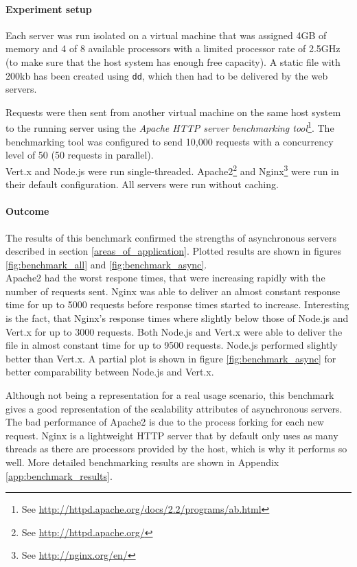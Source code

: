 \paragraph{Experiment setup} Each server was run isolated on a virtual machine
that was assigned 4GB of memory and 4 of 8 available processors with a limited processor rate
of 2.5GHz (to make sure that the host system has enough free capacity). A static
file with 200kb has been created using \texttt{dd}, which then had to be
delivered by the web servers.

Requests were then sent from another virtual machine on the same host system 
to the running server using the \textit{Apache HTTP server benchmarking 
tool}\footnote{See \url{http://httpd.apache.org/docs/2.2/programs/ab.html}}.
The benchmarking tool was configured to send 10,000 requests with a concurrency
level of 50 (50 requests in parallel).\\
Vert.x and Node.js were run single-threaded. Apache2\footnote{See \url{http://httpd.apache.org/}} and Nginx\footnote{See \url{http://nginx.org/en/}} were run in their
default configuration. All servers were run without caching.
\paragraph{Outcome} The results of this benchmark confirmed the strengths of asynchronous servers described in section \ref{areas_of_application}.
Plotted results are shown in figures \ref{fig:benchmark_all} and \ref{fig:benchmark_async}.\\
Apache2 had the worst respone times, that were increasing rapidly with the number of requests sent.
Nginx was able to deliver an almost constant response time for up to 5000 requests before response times started to increase.
Interesting is the fact, that Nginx's response times where slightly below those of Node.js and Vert.x for up to 3000 requests.
Both Node.js and Vert.x were able to deliver the file in almost constant time for up to 9500 requests. Node.js performed slightly better than
Vert.x. A partial plot is shown in figure \ref{fig:benchmark_async} for better comparability between Node.js and Vert.x.

Although not being a representation for a real usage scenario, this benchmark
gives a good representation of the scalability attributes of asynchronous 
servers. The bad performance of Apache2 is due to the process forking for each
new request. Nginx is a lightweight HTTP server that by default only uses as
many threads as there are processors provided by the host, which is why it
performs so well. More detailed benchmarking results are shown in Appendix \ref{app:benchmark_results}.


